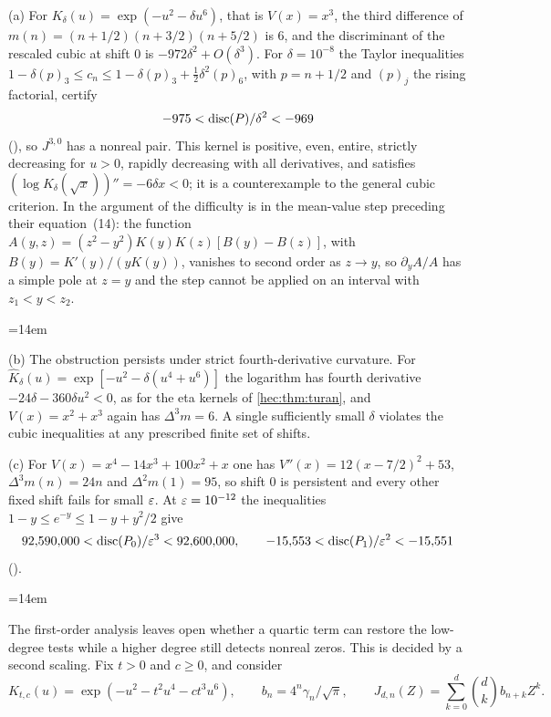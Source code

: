\begin{example}\label{hec:ex:sextic}
(a) For $K_\delta(u)=\exp(-u^2-\delta u^6)$, that is $V(x)=x^3$, the third difference of
$m(n)=(n+1/2)(n+3/2)(n+5/2)$ is $6$, and the discriminant of the rescaled cubic at shift $0$ is
$-972\delta^2+O(\delta^3)$. For $\delta=10^{-8}$ the Taylor inequalities
$1-\delta(p)_3\le c_n\le1-\delta(p)_3+\tfrac12\delta^2(p)_6$, with $p=n+1/2$ and $(p)_j$ the rising
factorial, certify
\[
 -975<\operatorname{disc}(P)/\delta^2<-969
\]
(), so $J^{3,0}$ has a nonreal
pair. This kernel is positive, even, entire, strictly decreasing for $u>0$, rapidly decreasing with all
derivatives, and satisfies $(\log K_\delta(\sqrt x))''=-6\delta x<0$; it is a counterexample to the
general cubic criterion. In the argument of \cite{DimitrovLucas2011Higher} the difficulty is in the
mean-value step preceding their equation~(14): the function
$A(y,z)=(z^2-y^2)K(y)K(z)[B(y)-B(z)]$, with $B(y)=K'(y)/(yK(y))$, vanishes to second order as $z\to y$, so
$\partial_yA/A$ has a simple pole at $z=y$ and the step cannot be applied on an interval with
$z_1<y<z_2$.
{\emergencystretch=14em\par}

(b) The obstruction persists under strict fourth-derivative curvature. For
$\widehat K_\delta(u)=\exp[-u^2-\delta(u^4+u^6)]$ the logarithm has fourth derivative
$-24\delta-360\delta u^2<0$, as for the eta kernels of \cref{hec:thm:turan}, and $V(x)=x^2+x^3$ again has
$\Delta^3m=6$. A single sufficiently small $\delta$ violates the cubic inequalities at any prescribed
finite set of shifts.

(c) For $V(x)=x^4-14x^3+100x^2+x$ one has $V''(x)=12(x-7/2)^2+53$, $\Delta^3m(n)=24n$ and
$\Delta^2m(1)=95$, so shift $0$ is persistent and every other fixed shift fails for small $\varepsilon$. At
$\varepsilon=10^{-12}$ the inequalities $1-y\le e^{-y}\le1-y+y^2/2$ give
\[
 92{,}590{,}000<\operatorname{disc}(P_0)/\varepsilon^3<92{,}600{,}000,\qquad-15{,}553<\operatorname{disc}(P_1)/\varepsilon^2<-15{,}551
\]
().
{\emergencystretch=14em\par}
\end{example}

The first-order analysis leaves open whether a quartic term can restore the low-degree tests while a
higher degree still detects nonreal zeros. This is decided by a second scaling. Fix $t>0$ and $c\ge0$,
and consider
\[
 K_{t,c}(u)=\exp(-u^2-t^2u^4-ct^3u^6),\qquad
 b_n=4^n\gamma_n/\sqrt\pi,\qquad J_{d,n}(Z)=\sum_{k=0}^d\binom dkb_{n+k}Z^k .
\]

